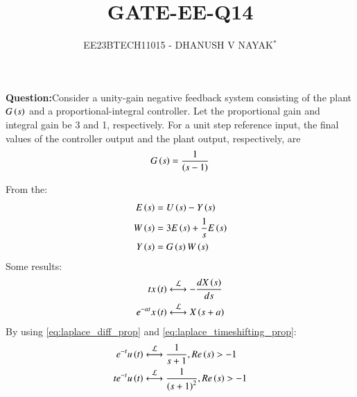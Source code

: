 \documentclass[journal,12pt,twocolumn]{IEEEtran}
\theoremstyle{remark}
\begin{document}

\title{GATE-EE-Q14}
\author{EE23BTECH11015 - DHANUSH V NAYAK$^{*}$%
}
\maketitle
\newpage
\bigskip
\renewcommand{\thefigure}{\arabic{figure}}
\renewcommand{\thetable}{\theenumi}
\textbf{Question:}Consider a unity-gain negative feedback system consisting of the plant $G\left(s\right)$  and a proportional-integral controller. Let the proportional gain and integral
gain be 3 and 1, respectively. For a unit step reference input, the final values of the
controller output and the plant output, respectively, are
\begin{align}
    G\left(s\right) = \frac{1}{\left(s-1\right)} \notag
\end{align}
\solution 

From the:
\begin{align}
    E\left(s\right)&= U\left(s\right) - Y\left(s\right)\label{eq:gate_ee_Q14.1}\\
W\left(s\right) &= 3E\left(s\right) + \frac{1}{s}E\left(s\right)\label{eq:gate_ee_Q14.2}\\
    Y\left(s\right) &= G\left(s\right)W\left(s\right) \label{eq:gate_ee_Q14.3}
\end{align}
Some results:
\begin{align}
    tx\brak{t} &\system{L} -\frac{d{X\brak{s}}}{ds} \label{eq:laplace_diff_prop}\\
    e^{-at}x\brak{t} &\system{L} X\brak{s+a}\label{eq:laplace_timeshifting_prop}
\end{align}
By using \eqref{eq:laplace_diff_prop} and \eqref{eq:laplace_timeshifting_prop}:
\begin{align}
    e^{-t}u\brak{t} &\system{L} \frac{1}{s+1} ,  Re\brak{s}>-1 \label{eq:gate_ee_Q14result.1}\\
    t e^{-t}u\brak{t} &\system{L} \frac{1}{\brak{s+1}^2},  Re\brak{s}>-1 
 \label{eq:gate_ee_Q14result.2}
\end{align}
\end{document}
